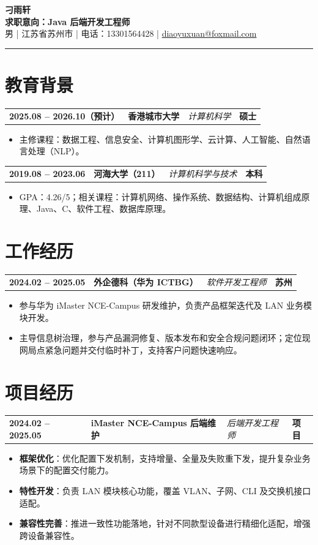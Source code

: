\documentclass[10pt,a4paper]{article}
\makeatletter
\newcommand{\entry}[4]{%
  \noindent
  \begin{tabularx}{\textwidth}{@{}>{\bfseries}l >{\raggedright\arraybackslash}X >{\raggedright\arraybackslash}l >{\bfseries\raggedleft\arraybackslash}l@{}}
    #1 & \textbf{#2} & \textit{#3} & #4\\
  \end{tabularx}\par
}
\makeatother
\begin{document}
\begin{center}
  {\fontsize{24}{27}\selectfont\bfseries\color{accent}刁雨轩}\\[0.25em]
  {\normalsize\bfseries 求职意向：Java 后端开发工程师}\\[0.25em]
  {\small\color{muted}男 | 江苏省苏州市 | 电话：13301564428 | \href{mailto:diaoyuxuan@foxmail.com}{diaoyuxuan@foxmail.com}}
\end{center}
\vspace{-0.15em}
{\color{accent}\rule{\textwidth}{0.8pt}}

\section{教育背景}
\entry{2025.08 -- 2026.10（预计）}{香港城市大学}{计算机科学}{硕士}
\begin{itemize}
  \item 主修课程：数据工程、信息安全、计算机图形学、云计算、人工智能、自然语言处理（NLP）。
\end{itemize}

\entry{2019.08 -- 2023.06}{河海大学（211）}{计算机科学与技术}{本科}
\begin{itemize}
  \item GPA：4.26/5；相关课程：计算机网络、操作系统、数据结构、计算机组成原理、Java、C、软件工程、数据库原理。
\end{itemize}

\section{工作经历}
\entry{2024.02 -- 2025.05}{外企德科（华为 ICTBG）}{软件开发工程师}{苏州}
\begin{itemize}
  \item 参与华为 iMaster NCE-Campus 研发维护，负责产品框架迭代及 LAN 业务模块开发。
  \item 主导信息树治理，参与产品漏洞修复、版本发布和安全合规问题闭环；定位现网局点紧急问题并交付临时补丁，支持客户问题快速响应。
\end{itemize}

\section{项目经历}
\entry{2024.02 -- 2025.05}{iMaster NCE-Campus 后端维护}{后端开发工程师}{项目}
\begin{itemize}
  \item \textbf{框架优化}：优化配置下发机制，支持增量、全量及失败重下发，提升复杂业务场景下的配置交付能力。
  \item \textbf{特性开发}：负责 LAN 模块核心功能，覆盖 VLAN、子网、CLI 及交换机接口适配。
  \item \textbf{兼容性完善}：推进一致性功能落地，针对不同款型设备进行精细化适配，增强跨设备兼容性。
\end{itemize}
\end{document}
